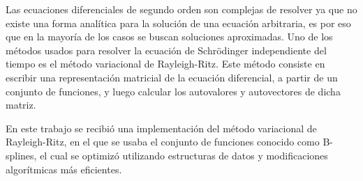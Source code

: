 \documentclass[a4paper,openright,12pt, oneside]{book}
\begin{document}
Las ecuaciones diferenciales de segundo orden son complejas de resolver ya que no existe una forma anal\'itica para la soluci\'on de una ecuaci\'on arbitraria, es por eso que en la mayor\'ia de los casos se buscan soluciones aproximadas. Uno de los m\'etodos usados para resolver la ecuaci\'on de Schr\"odinger independiente del tiempo es el m\'etodo variacional de Rayleigh-Ritz. Este m\'etodo consiste en escribir una representaci\'on matricial de la ecuaci\'on diferencial, a partir de un conjunto de funciones, y luego calcular los autovalores y autovectores de dicha matriz.

En este trabajo se recibi\'o una implementaci\'on del m\'etodo variacional de Rayleigh-Ritz, en el que se usaba el conjunto de funciones conocido como B-splines, el cual se optimiz\'o utilizando estructuras de datos y modificaciones algor\'itmicas m\'as eficientes.


\tableofcontents %

\setcounter{chapter}{1}


\setcounter{section}{0}


\setcounter{section}{0}


\setcounter{section}{0}


\setcounter{section}{0}


\setcounter{section}{0}

\end{document}
